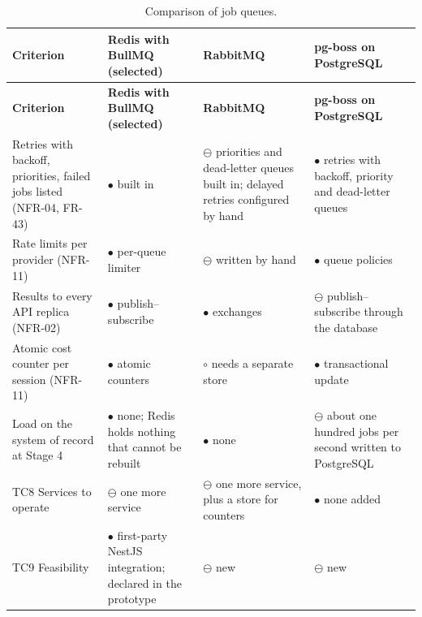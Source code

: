 {\small{}\renewcommand{\arraystretch}{1.1}
\begin{longtable}{|>{\raggedright\arraybackslash}p{}|>{\raggedright\arraybackslash}p{}|>{\raggedright\arraybackslash}p{}|>{\raggedright\arraybackslash}p{}|}
\caption{Comparison of job queues.} \\
\hline
\textbf{Criterion} & \textbf{Redis with BullMQ (selected)} & \textbf{RabbitMQ\cite{r184}} & \textbf{pg-boss on PostgreSQL\cite{r185}} \\ \hline
\endfirsthead
\hline
\textbf{Criterion} & \textbf{Redis with BullMQ (selected)} & \textbf{RabbitMQ\cite{r184}} & \textbf{pg-boss on PostgreSQL\cite{r185}} \\ \hline
\endhead
Retries with backoff, priorities, failed jobs listed (NFR-04, FR-43) & $\bullet$ built in\cite{r154} & $\ominus$ priorities and dead-letter queues built in; delayed retries configured by hand & $\bullet$ retries with backoff, priority and dead-letter queues \\ \hline
Rate limits per provider (NFR-11) & $\bullet$ per-queue limiter & $\ominus$ written by hand & $\bullet$ queue policies \\ \hline
Results to every API replica (NFR-02) & $\bullet$ publish--subscribe & $\bullet$ exchanges & $\ominus$ publish--subscribe through the database \\ \hline
Atomic cost counter per session (NFR-11) & $\bullet$ atomic counters & $\circ$ needs a separate store & $\bullet$ transactional update \\ \hline
Load on the system of record at Stage 4 & $\bullet$ none; Redis holds nothing that cannot be rebuilt & $\bullet$ none & $\ominus$ about one hundred jobs per second written to PostgreSQL \\ \hline
TC8 Services to operate & $\ominus$ one more service & $\ominus$ one more service, plus a store for counters & $\bullet$ none added \\ \hline
TC9 Feasibility & $\bullet$ first-party NestJS integration\cite{r149}; declared in the prototype & $\ominus$ new & $\ominus$ new \\ \hline
\end{longtable}
}

